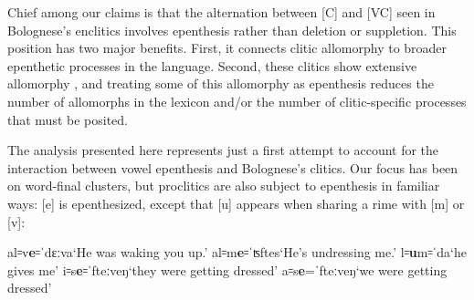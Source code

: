 \documentclass[output=paper,colorlinks,citecolor=brown]{langscibook}
\begin{document}
Chief among our claims is that the alternation between [C] and [VC] seen in Bolognese's enclitics involves epenthesis rather than deletion or suppletion.  This position has two major benefits.  First, it connects clitic allomorphy to broader epenthetic processes in the language.  Second, these clitics show extensive allomorphy \citep{rubinkaplanallomorphywithls}, and treating some of this allomorphy as epenthesis reduces the number of allomorphs in the lexicon and/or the number of clitic-specific processes that must be posited.

The analysis presented here represents just a first attempt to account for the interaction between vowel epenthesis and Bolognese's clitics.  Our focus has been on word-final clusters, but proclitics are also subject to epenthesis in familiar ways: [e] is epenthesized, except that [u] appears when sharing a rime with [m] or [v]:

\begin{exe}
    \ex \label{procliticepenthesis}
        \begin{xlist}
            \ex al꞊v\textbf{e}꞊ˈdɛːva\tab `He was waking you up.'
            \ex al꞊m\textbf{e}꞊ˈʦ{ftes}\tab `He's undressing me.'
            \ex l꞊\textbf{u}m꞊ˈda\tab `he gives me'
            \ex i꞊s\textbf{e}꞊ˈfteːveŋ\tab `they were getting dressed'
            \ex a꞊s\textbf{e}=ˈfteːveŋ\tab `we were getting dressed'
        \end{xlist}
\end{exe}
\end{document}

